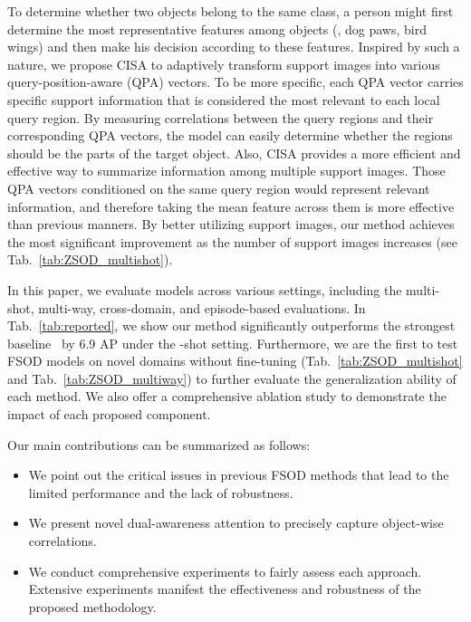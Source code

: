 \documentclass[journal]{IEEEtran}
\begin{document}
To determine whether two objects belong to the same class, a person might first determine the most representative features among objects (, dog paws, bird wings) and then make his decision according to these features.
Inspired by such a nature, we propose CISA to adaptively transform support images into various query-position-aware (QPA) vectors.
To be more specific, each QPA vector carries specific support information that is considered the most relevant to each local query region.
By measuring correlations between the query regions and their corresponding QPA vectors, the model can easily determine whether the regions should be the parts of the target object.
Also, CISA provides a more efficient and effective way to summarize information among multiple support images.
Those QPA vectors conditioned on the same query region would represent relevant information, and therefore taking the mean feature across them is more effective than previous manners.
By better utilizing support images, our method achieves the most significant improvement as the number of support images increases (see Tab.~\ref{tab:ZSOD_multishot}).



In this paper, we evaluate models across various settings, including the multi-shot, multi-way, cross-domain, and episode-based evaluations.  
In Tab.~\ref{tab:reported}, we show our method significantly outperforms the strongest baseline~\cite{xiao2020few} by 6.9 AP under the -shot setting.
Furthermore, we are the first to test FSOD models on novel domains without fine-tuning (Tab.~\ref{tab:ZSOD_multishot} and Tab.~\ref{tab:ZSOD_multiway}) to further evaluate the generalization ability of each method.
We also offer a comprehensive ablation study to demonstrate the impact of each proposed component.


Our main contributions can be summarized as follows:
\begin{itemize}
    \item We point out the critical issues in previous FSOD methods that lead to the limited performance and the lack of robustness.
    \item We present novel dual-awareness attention to precisely capture object-wise correlations.
\item We conduct comprehensive experiments to fairly assess each approach. Extensive experiments manifest the effectiveness and robustness of the proposed methodology.
\end{itemize}
\end{document}

